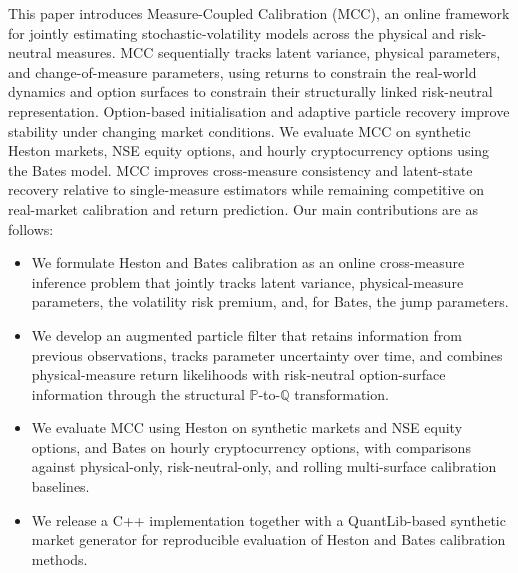 \documentclass[sigconf,anonymous,review]{acmart}
\begin{document}
This paper introduces Measure-Coupled Calibration (MCC), an online framework for jointly estimating stochastic-volatility models across the physical and risk-neutral measures. MCC sequentially tracks latent
variance, physical parameters, and change-of-measure parameters, using returns to constrain the real-world dynamics and option surfaces
to constrain their structurally linked risk-neutral representation. Option-based initialisation and adaptive particle recovery improve stability under changing market conditions. We evaluate MCC on synthetic Heston markets, NSE equity options, and hourly cryptocurrency options using the Bates model. MCC improves cross-measure consistency
and latent-state recovery relative to single-measure estimators while remaining competitive on real-market calibration and return prediction.
Our main contributions are as follows:
\begin{itemize} 
    \item We formulate Heston and Bates calibration as an online cross-measure inference problem that jointly tracks latent variance, physical-measure parameters, the volatility risk premium, and, for Bates, the jump parameters. 
    
    \item We develop an augmented particle filter that retains information from previous observations, tracks parameter uncertainty over time, and
    combines physical-measure return likelihoods with risk-neutral
    option-surface information through the structural $\mathbb{P}$-to-$\mathbb{Q}$ transformation.
    
    \item We evaluate MCC using Heston on synthetic markets and NSE equity options, and Bates on hourly cryptocurrency options, with comparisons against physical-only, risk-neutral-only, and rolling multi-surface calibration baselines. 
    
    \item We release a C++ implementation together with a QuantLib-based synthetic market generator for reproducible evaluation of Heston and Bates calibration methods. \end{itemize}
\end{document}
